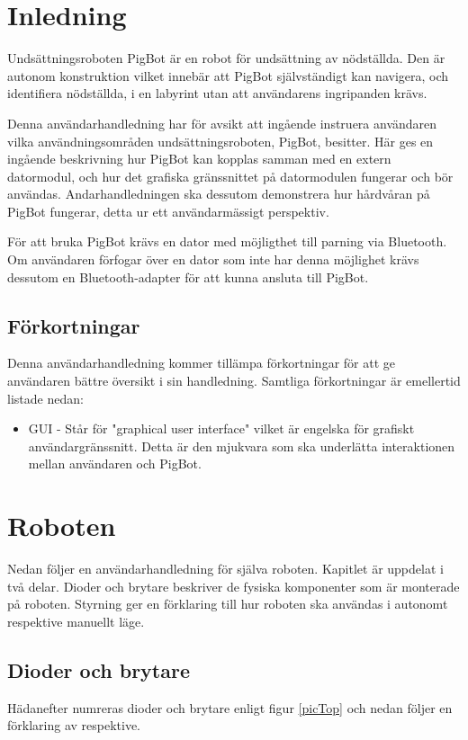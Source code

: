 \documentclass[11pt]{article}
\begin{document}
\pagebreak
{}

\section{Inledning}
Undsättningsroboten PigBot är en robot för undsättning av nödställda. Den är autonom konstruktion vilket innebär att PigBot självständigt kan navigera, och identifiera nödställda, i en labyrint utan att användarens ingripanden krävs.

Denna användarhandledning har för avsikt att ingående instruera användaren vilka användningsområden undsättningsroboten, PigBot, besitter. Här ges en ingående beskrivning hur PigBot kan kopplas samman med en extern datormodul, och hur det grafiska gränssnittet på datormodulen fungerar och bör användas. Andarhandledningen ska dessutom demonstrera hur hårdvåran på PigBot fungerar, detta ur ett användarmässigt perspektiv. 

För att bruka PigBot krävs en dator med möjligthet till parning via Bluetooth\textsuperscript{\circledR}. Om användaren förfogar över en dator som inte har denna möjlighet krävs dessutom en Bluetooth\textsuperscript{\circledR}-adapter för att kunna ansluta till PigBot.

\subsection{Förkortningar}
Denna användarhandledning kommer tillämpa förkortningar för att ge användaren bättre översikt i sin handledning. Samtliga förkortningar är emellertid listade nedan:

\begin{itemize}
\item GUI - Står för "graphical user interface" vilket är engelska för grafiskt användargränssnitt. Detta är den mjukvara som ska underlätta interaktionen mellan användaren och PigBot.
\end{itemize}

\section{Roboten}
Nedan följer en användarhandledning för själva roboten. Kapitlet är uppdelat i två delar. Dioder och brytare beskriver de fysiska komponenter som är monterade på roboten. Styrning ger en förklaring till hur roboten ska användas i autonomt respektive manuellt läge.

\subsection{Dioder och brytare}
Hädanefter numreras dioder och brytare enligt figur \ref{picTop} och nedan följer en förklaring av respektive.
\end{document}
